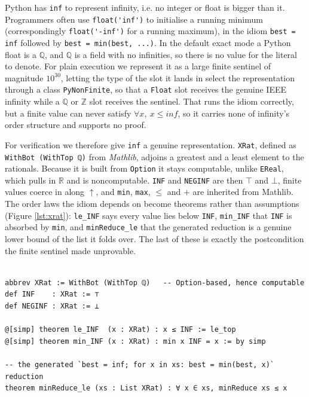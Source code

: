 \documentclass{article}
\newcommand{\code}{\lstinline}
\begin{document}
{Python has \code{inf} to represent infinity, i.e. no integer or float is bigger than it. Programmers often use \code{float('inf')} to initialise a running minimum (correspondingly \code{float('-inf')} for a running maximum), in the idiom \code{best = inf} followed by \code{best = min(best, ...)}. In the default exact mode a Python float is a $\mathbb{Q}$, and $\mathbb{Q}$ is a field with no infinities, so there is no value for the literal to denote. For plain execution we represent it as a large finite sentinel of magnitude $10^{30}$, letting the type of the slot it lands in select the representation through a class \code{PyNonFinite}, so that a \code{Float} slot receives the genuine IEEE infinity while a $\mathbb{Q}$ or $\mathbb{Z}$ slot receives the sentinel. That runs the idiom correctly, but a finite value can never satisfy $\forall x,\ x \le \mathit{inf}$, so it carries none of infinity's order structure and supports no proof.

For verification we therefore give \code{inf} a genuine representation. \code{XRat}, defined as \code{WithBot (WithTop ℚ)} from \emph{Mathlib}, adjoins a greatest and a least element to the rationals. Because it is built from \code{Option} it stays computable, unlike \code{EReal}, which pulls in $\mathbb{R}$ and is noncomputable. \code{INF} and \code{NEGINF} are then $\top$ and $\bot$, finite values coerce in along $\uparrow$, and \code{min}, \code{max}, $\le$ and $+$ are inherited from Mathlib. The order laws the idiom depends on become theorems rather than assumptions (Figure \ref{lst:xrat}): \code{le_INF} says every value lies below \code{INF}, \code{min_INF} that \code{INF} is absorbed by \code{min}, and \code{minReduce_le} that the generated reduction is a genuine lower bound of the list it folds over. The last of these is exactly the postcondition the finite sentinel made unprovable.


\begin{lstlisting}[style=lean,caption={A provable \code{inf}: extended rationals and the laws a proof gets.},label={lst:xrat}]

abbrev XRat := WithBot (WithTop ℚ)   -- Option-based, hence computable
def INF    : XRat := ⊤
def NEGINF : XRat := ⊥

@[simp] theorem le_INF  (x : XRat) : x ≤ INF := le_top
@[simp] theorem min_INF (x : XRat) : min x INF = x := by simp

-- the generated `best = inf; for x in xs: best = min(best, x)` reduction
theorem minReduce_le (xs : List XRat) : ∀ x ∈ xs, minReduce xs ≤ x
\end{lstlisting}



}
\end{document}
